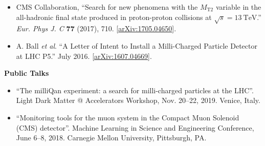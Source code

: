 \begin{vitae}
\begin{itemize}
\item CMS Collaboration, ``Search for new phenomena with the $M_\mathrm{T2}$ variable in the all-hadronic
  final state produced in proton-proton collisions at $\sqrt{s}=13~\mathrm{TeV}$.'' \textit{Eur. Phys J. C}
  \textbf{77} (2017), 710.
  [\href{https://arxiv.org/abs/1705.04650}{arXiv:1705.04650}].

\item A. Ball \textit{et al}. ``A Letter of Intent to Install a Milli-Charged Particle Detector at LHC P5.'' July 2016.
  [\href{https://arxiv.org/abs/1607.04669}{arXiv:1607.04669}].

\end{itemize}


\vspace{0.2cm}
\textbf{Public Talks}

\begin{itemize}

\item ``The milliQan experiment: a search for milli-charged particles at the LHC''.
Light Dark Matter @ Accelerators Workshop, Nov. 20--22, 2019. Venice, Italy.

\item ``Monitoring tools for the muon system in the Compact Muon Solenoid (CMS) detector''.
Machine Learning in Science and Engineering Conference, June 6--8, 2018. Carnegie Mellon
University, Pittsburgh, PA.

\end{itemize}

\end{vitae}
